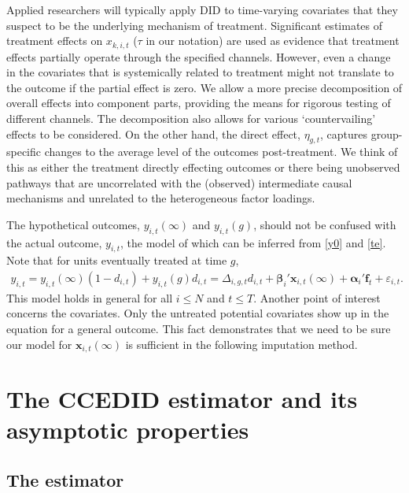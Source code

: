\documentclass[12pt,fleqn]{article}
\def\*#1{\mathbf{#1}}
\def\+#1{\boldsymbol{#1}}
\begin{document}
Applied researchers will typically apply DID to time-varying covariates that they suspect to be the underlying mechanism of treatment. Significant estimates of treatment effects on $x_{k,i,t}$ ($\tau$ in our notation) are used as evidence that treatment effects partially operate through the specified channels. However, even a change in the covariates that is systemically related to treatment might not translate to the outcome if the partial effect is zero. We allow a more precise decomposition of overall effects into component parts, providing the means for rigorous testing of different channels. The decomposition also allows for various `countervailing' effects to be considered. On the other hand, the direct effect, $\eta_{g,t}$, captures group-specific changes to the average level of the outcomes post-treatment. We think of this as either the treatment directly effecting outcomes or there being unobserved pathways that are uncorrelated with the (observed) intermediate causal mechanisms and unrelated to the heterogeneous factor loadings. 

The hypothetical outcomes, $y_{i,t}(\infty)$ and $y_{i,t}(g)$, should not be confused with the actual outcome, $y_{i,t}$, the model of which can be inferred from \eqref{y0} and \eqref{te}. Note that for units eventually treated at time $g$,
\begin{align}
y_{i,t} = y_{i,t}(\infty)(1-d_{i,t}) + y_{i,t}(g)d_{i,t}  = \Delta_{i,g,t}d_{i,t} + \+\beta_i'\*x_{i,t}(\infty) + \+\alpha_i'\*f_t + \varepsilon_{i,t}. \label{y}
\end{align}
This model holds in general for all $i \leq N$ and $t \leq T$. Another point of interest concerns the covariates. Only the untreated potential covariates show up in the equation for a general outcome. This fact demonstrates that we need to be sure our model for $\*x_{i,t}(\infty)$ is sufficient in the following imputation method.




\section{The CCEDID estimator and its asymptotic properties}

\subsection{The estimator}
\end{document}
